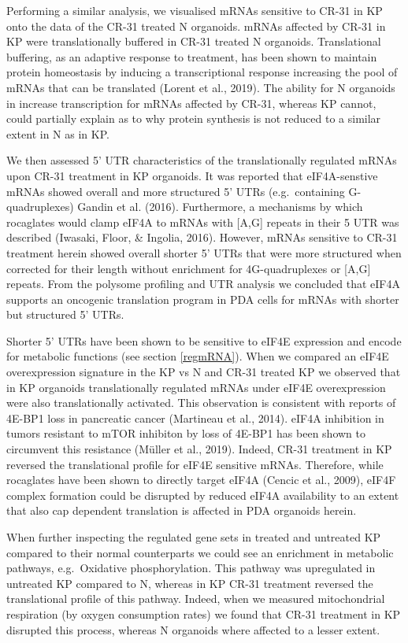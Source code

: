 \documentclass[
  12pt,
  openany]{book}
\begin{document}
Performing a similar analysis, we visualised mRNAs sensitive to CR-31 in KP onto the data of the CR-31 treated N organoids. mRNAs affected by CR-31 in KP were translationally buffered in CR-31 treated N organoids. Translational buffering, as an adaptive response to treatment, has been shown to maintain protein homeostasis by inducing a transcriptional response increasing the pool of mRNAs that can be translated (Lorent et al., 2019). The ability for N organoids in increase transcription for mRNAs affected by CR-31, whereas KP cannot, could partially explain as to why protein synthesis is not reduced to a similar extent in N as in KP.

We then assessed 5' UTR characteristics of the translationally regulated mRNAs upon CR-31 treatment in KP organoids. It was reported that eIF4A-senstive mRNAs showed overall and more structured 5' UTRs (e.g.~containing G-quadruplexes) Gandin et al. (2016). Furthermore, a mechanisms by which rocaglates would clamp eIF4A to mRNAs with {[}A,G{]} repeats in their 5 UTR was described (Iwasaki, Floor, \& Ingolia, 2016). However, mRNAs sensitive to CR-31 treatment herein showed overall shorter 5' UTRs that were more structured when corrected for their length without enrichment for 4G-quadruplexes or {[}A,G{]} repeats. From the polysome profiling and UTR analysis we concluded that eIF4A supports an oncogenic translation program in PDA cells for mRNAs with shorter but structured 5' UTRs.

Shorter 5' UTRs have been shown to be sensitive to eIF4E expression and encode for metabolic functions (see section \ref{regmRNA}). When we compared an eIF4E overexpression signature in the KP vs N and CR-31 treated KP we observed that in KP organoids translationally regulated mRNAs under eIF4E overexpression were also translationally activated. This observation is consistent with reports of 4E-BP1 loss in pancreatic cancer (Martineau et al., 2014). eIF4A inhibition in tumors resistant to mTOR inhibiton by loss of 4E-BP1 has been shown to circumvent this resistance (Müller et al., 2019). Indeed, CR-31 treatment in KP reversed the translational profile for eIF4E sensitive mRNAs. Therefore, while rocaglates have been shown to directly target eIF4A (Cencic et al., 2009), eIF4F complex formation could be disrupted by reduced eIF4A availability to an extent that also cap dependent translation is affected in PDA organoids herein.

When further inspecting the regulated gene sets in treated and untreated KP compared to their normal counterparts we could see an enrichment in metabolic pathways, e.g.~Oxidative phosphorylation. This pathway was upregulated in untreated KP compared to N, whereas in KP CR-31 treatment reversed the translational profile of this pathway. Indeed, when we measured mitochondrial respiration (by oxygen consumption rates) we found that CR-31 treatment in KP disrupted this process, whereas N organoids where affected to a lesser extent.
\end{document}

